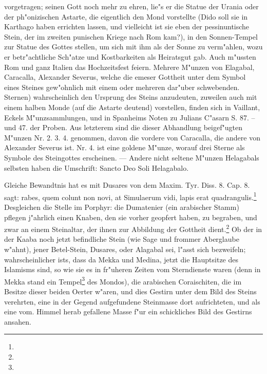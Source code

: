 \documentclass[a4paper, 11pt, oneside, polutonikogreek, german]{article}
\begin{document}
vorgetragen; seinen Gott noch mehr zu ehren, lie"s er die Statue der Urania oder der ph"onizischen Astarte, die eigentlich den Mond vorstellte (Dido soll sie in Karthago haben errichten lassen, und vielleicht ist sie eben der pessinuntische Stein, der im zweiten punischen Kriege nach Rom kam?), in den Sonnen-Tempel zur Statue des Gottes stellen, um sich mit ihm als der Sonne zu verm"ahlen, wozu er betr"achtliche Sch"atze und Kostbarkeiten als Heiratsgut gab. Auch m"ussten Rom und ganz Italien das Hochzeitsfest feiern. Mehrere M"unzen von Elagabal, Caracalla, Alexander Severus, welche die emeser Gottheit unter dem Symbol eines Steines gew"ohnlich mit einem oder mehreren dar"uber schwebenden. Sternen) wahrscheinlich den Ursprung des Steins anzudeuten, zuweilen auch mit einem halben Monde (auf die Astarte deutend) vorstellen, finden sich in Vaillant, Eckels M"unzsammlungen, und in Spanheims Noten zu Julians C"asarn S. 87. -- und 47. der Proben. Aus letzterem sind die dieser Abhandlung beigef"ugten M"unzen Nr. 2. 3. 4. genommen, davon die vordere von Caracalla, die andere von Alexander Severus ist. Nr. 4. ist eine goldene M"unze, worauf drei Sterne als Symbole des Steingottes erscheinen. --- Andere nicht seltene M"unzen Helagabals selbsten haben die Umschrift: Sancto Deo Soli Helagabalo.

Gleiche Bewandtnis hat es mit Dusares von dem Maxim. Tyr. Diss. 8. Cap. 8. sagt: rabes, quem colunt non novi, at Simulaerum vidi, lapis erat quadrangulis.\footnote{} Desgleichen die Stelle im Porphyr: die Dumatenier (ein arabischer Stamm) pflegen j"ahrlich einen Knaben, den sie vorher geopfert haben, zu begraben, und zwar an einem Steinaltar, der ihnen zur Abbildung der Gottheit dient.\footnote{} Ob der in der Kaaba noch jetzt befindliche Stein (wie Sage und frommer Aberglaube w"ahnt), jener Betel-Stein, Dusares, oder Alagabal sei, l"asst sich bezweifeln; wahrscheinlicher ists, dass da Mekka und Medina, jetzt die Hauptsitze des Islamisms sind, so wie sie es in fr"uheren Zeiten vom Sterndienste waren (denn in Mekka stand ein Tempel\footnote{} des Mondos), die arabischen Coraischiten, die im Besitze dieser beiden Oerter w"aren, und dies Gestirn unter dem Bild des Steins verehrten, eine in der Gegend aufgefundene Steinmasse dort aufrichteten, und als eine vom. Himmel herab gefallene Masse f"ur ein schickliches Bild des Gestirns ansahen.
\end{document}

